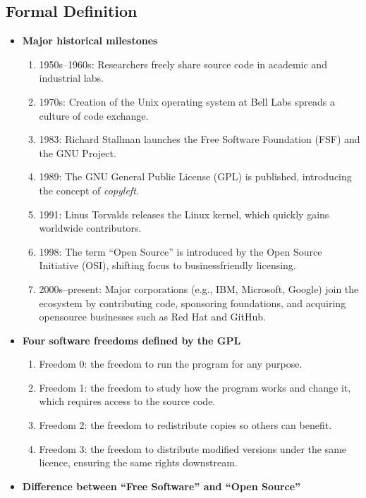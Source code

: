 \documentclass[12pt, a4paper]{article}
\begin{document}
\subsection{Formal Definition}
\begin{itemize}
  \item \textbf{Major historical milestones}\\
    \begin{enumerate}
      \item 1950s--1960s: Researchers freely share source code in academic and industrial labs. 
      \item 1970s: Creation of the Unix operating system at Bell Labs spreads a culture of code exchange. 
      \item 1983: Richard Stallman launches the Free Software Foundation (FSF) and the GNU Project. 
      \item 1989: The GNU General Public License (GPL) is published, introducing the concept of \emph{copyleft}. 
      \item 1991: Linus Torvalds releases the Linux kernel, which quickly gains worldwide contributors. 
      \item 1998: The term ``Open Source'' is introduced by the Open Source Initiative (OSI), shifting focus to businessfriendly licensing. 
      \item 2000s--present: Major corporations (e.g., IBM, Microsoft, Google) join the ecosystem by contributing code, sponsoring foundations, and acquiring opensource businesses such as Red Hat and GitHub. 
    \end{enumerate}
  \item \textbf{Four software freedoms defined by the GPL}\\
    \begin{enumerate}
      \item Freedom 0: the freedom to run the program for any purpose. 
      \item Freedom 1: the freedom to study how the program works and change it, which requires access to the source code. 
      \item Freedom 2: the freedom to redistribute copies so others can benefit. 
      \item Freedom 3: the freedom to distribute modified versions under the same licence, ensuring the same rights downstream. 
    \end{enumerate}
  \item \textbf{Difference between ``Free Software'' and ``Open Source''}\\

\end{itemize}
\end{document}
